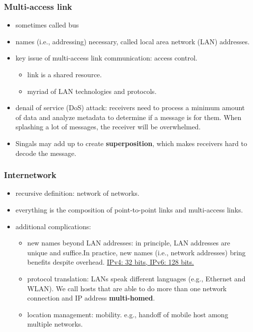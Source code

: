 \documentclass{../../ainote}
\begin{document}
\subsubsection{Multi-access link}
\begin{itemize}[leftmargin=*]
    \item sometimes called bus
    \item names (i.e., addressing) necessary, called local area network (LAN) addresses.
    \item key issue of multi-access link communication: access
    control.
        \begin{itemize}
            \item link is a shared resource.
            \item myriad of LAN technologies and protocols.
        \end{itemize}
    \item denail of service (DoS) attack: receivers need to process a minimum amount of data and analyze metadata to determine if a message is for them. When splashing a lot of messages, the receiver will be overwhelmed.
    \item Singals may add up to create \textbf{superposition}, which makes receivers hard to decode the message.
\end{itemize}  

\subsubsection{Internetwork}
\begin{itemize}[leftmargin=*]
    \item recursive definition: network of networks.
    \item everything is the composition of point-to-point links and multi-access links.
    \item additional complications:
        \begin{itemize}
            \item new names beyond LAN addresses: in principle, LAN addresses are unique and suffice.In practice, new names (i.e., network addresses) bring benefits despite overhead. \underline{IPv4: 32 bits, IPv6: 128 bits.}
            \item protocol translation: LANs speak different languages (e.g., Ethernet and
            WLAN). We call hosts that are able to do more than one network connection and IP address \textbf{multi-homed}.
            \item location management: mobility. e.g., handoff of mobile host among multiple networks.
        \end{itemize}
\end{itemize}
\end{document}
